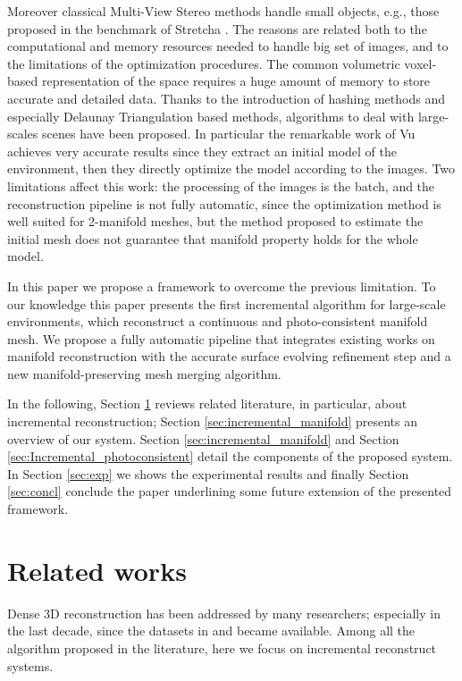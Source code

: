 Moreover classical Multi-View Stereo methods \cite{gargallo2005bayesian,delaunoy_et_al_08} handle small objects, e.g., those proposed in the benchmark of Stretcha \etal \cite{strecha2006combined}.
The reasons are related both to the computational and memory resources needed to handle big set of images, and to the limitations of the optimization procedures.
The common volumetric voxel-based representation of the space requires a huge amount of memory to store accurate and detailed data.
Thanks to the introduction of hashing methods and especially  Delaunay Triangulation based methods, algorithms to deal with large-scales scenes have been proposed.
In particular the remarkable work of Vu \etal \cite{vu_et_al_2012} achieves very accurate results since they extract an initial model of the environment, then they directly optimize the model according to the images. 
Two limitations affect this work: the processing of the images is the batch, and the reconstruction pipeline is not fully automatic, since the optimization method is well suited for 2-manifold meshes, but the method proposed to estimate the initial mesh does not guarantee that manifold property holds for the whole model.


In this paper we propose a framework to overcome the previous limitation.
To our knowledge this paper presents the first incremental algorithm for large-scale environments, which reconstruct a continuous and photo-consistent manifold mesh. 
We propose a fully automatic pipeline that integrates existing works on manifold reconstruction with the accurate surface evolving refinement step and a new manifold-preserving mesh merging algorithm.

In the following, Section \ref{sec:related_works} reviews related literature, in particular, about incremental reconstruction; Section \ref{sec:incremental_manifold}  presents an overview of our system. Section \ref{sec:incremental_manifold} and Section \ref{sec:Incremental_photoconsistent} detail the components of the proposed system. 
In Section \ref{sec:exp} we shows the experimental results and finally Section \ref{sec:concl} conclude the paper underlining some future extension of the presented framework.

\section{Related works}
\label{sec:related_works}
Dense 3D reconstruction has been addressed by many researchers; especially in the last decade, since the datasets in \cite{seitz_et_al06} and \cite{strecha2008} became available. Among all the algorithm proposed in the literature, here we focus on incremental reconstruct systems. 

